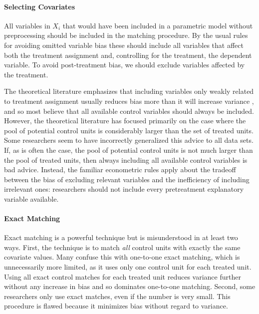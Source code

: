 \documentclass[11pt,titlepage]{article}
\begin{document}
\paragraph{Selecting Covariates}
All variables in $X_i$ that would have been included in a parametric
model without preprocessing should be included in the matching
procedure.  By the usual rules for avoiding omitted variable bias
these should include all variables that affect both the treatment
assignment and, controlling for the treatment, the dependent variable.
To avoid post-treatment bias, we should exclude variables affected by
the treatment.

The theoretical literature emphasizes that including variables only
weakly related to treatment assignment usually reduces bias more than
it will increase variance \citep{RubTho96, HecIchSmi98}, and so most
believe that all available control variables should always be
included.  However, the theoretical literature has focused primarily
on the case where the pool of potential control units is considerably
larger than the set of treated units.  Some researchers seem to
have incorrectly generalized this advice to all data sets.  If, as is
often the case, the pool of potential control units is not much larger
than the pool of treated units, then always including all available
control variables is bad advice.  Instead, the familiar econometric
rules apply about the tradeoff between the bias of excluding relevant
variables and the inefficiency of including irrelevant ones:
researchers should not include every pretreatment explanatory
variable available.

\paragraph{Exact Matching}  
Exact matching is a powerful technique but is misunderstood in at
least two ways.  First, the technique is to match \emph{all} control
units with exactly the same covariate values.  Many confuse this with
one-to-one exact matching, which is unnecessarily more limited, as it
uses only one control unit for each treated unit.  Using all exact
control matches for each treated unit reduces variance further without
any increase in bias and so dominates one-to-one matching.  Second,
some researchers only use exact matches, even if the number is very
small.  This procedure is flawed because it minimizes bias without
regard to variance.
\end{document}
